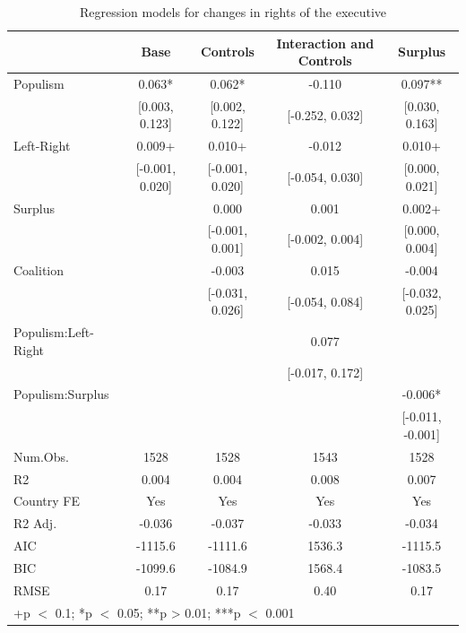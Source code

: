 \documentclass[
  abstract]{article}
\begin{document}
\hypertarget{tbl-executive}{}
\begin{table}
\caption{\label{tbl-executive}Regression models for changes in rights of the executive }\tabularnewline

\centering\centering\centering
\begin{tabular}[t]{lcccc}
\toprule
  & Base & Controls & Interaction and Controls & Surplus\\
\midrule
Populism & 0.063* & 0.062* & -0.110 & 0.097**\\
 & {}[0.003, 0.123] & {}[0.002, 0.122] & {}[-0.252, 0.032] & {}[0.030, 0.163]\\
Left-Right & 0.009+ & 0.010+ & -0.012 & 0.010+\\
 & {}[-0.001, 0.020] & {}[-0.001, 0.020] & {}[-0.054, 0.030] & {}[0.000, 0.021]\\
Surplus &  & 0.000 & 0.001 & 0.002+\\
 &  & {}[-0.001, 0.001] & {}[-0.002, 0.004] & {}[0.000, 0.004]\\
Coalition &  & -0.003 & 0.015 & -0.004\\
 &  & {}[-0.031, 0.026] & {}[-0.054, 0.084] & {}[-0.032, 0.025]\\
Populism:Left-Right &  &  & 0.077 & \\
 &  &  & {}[-0.017, 0.172] & \\
Populism:Surplus &  &  &  & -0.006*\\
 &  &  &  & {}[-0.011, -0.001]\\
\midrule
Num.Obs. & 1528 & 1528 & 1543 & 1528\\
R2 & 0.004 & 0.004 & 0.008 & 0.007\\
Country FE & Yes & Yes & Yes & Yes\\
R2 Adj. & -0.036 & -0.037 & -0.033 & -0.034\\
AIC & -1115.6 & -1111.6 & 1536.3 & -1115.5\\
BIC & -1099.6 & -1084.9 & 1568.4 & -1083.5\\
RMSE & 0.17 & 0.17 & 0.40 & 0.17\\
\bottomrule
\multicolumn{5}{l}{\rule{0pt}{1em}+p $<$ 0.1; *p $<$ 0.05; **p > 0.01; ***p $<$ 0.001}\\
\end{tabular}
\end{table}

\elandscape
\end{document}
